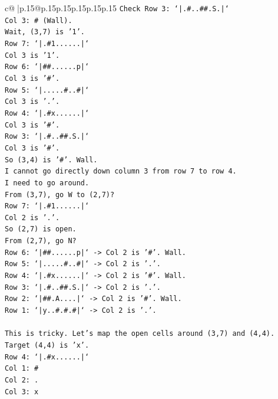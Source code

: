 \documentclass{article}
\begin{document}
{\begin{supertabular}{c@{$\;$}|p{.15\linewidth}@{}p{.15\linewidth}p{.15\linewidth}p{.15\linewidth}p{.15\linewidth}p{.15\linewidth}}
{{{\texttt{Check Row 3: `|.\#..\#\#.S.|`} \\
\texttt{Col 3: \# (Wall).} \\
\texttt{Wait, (3,7) is '1'.} \\
\texttt{Row 7: `|.\#1......|`} \\
\texttt{Col 3 is '1'.} \\
\texttt{Row 6: `|\#\#......p|`} \\
\texttt{Col 3 is '\#'.} \\
\texttt{Row 5: `|.....\#..\#|`} \\
\texttt{Col 3 is '.'.} \\
\texttt{Row 4: `|.\#x......|`} \\
\texttt{Col 3 is '\#'.} \\
\texttt{Row 3: `|.\#..\#\#.S.|`} \\
\texttt{Col 3 is '\#'.} \\
\texttt{So (3,4) is '\#'. Wall.} \\
\texttt{I cannot go directly down column 3 from row 7 to row 4.} \\
\texttt{I need to go around.} \\
\texttt{From (3,7), go W to (2,7)?} \\
\texttt{Row 7: `|.\#1......|`} \\
\texttt{Col 2 is '.'.} \\
\texttt{So (2,7) is open.} \\
\texttt{From (2,7), go N?} \\
\texttt{Row 6: `|\#\#......p|` {-}> Col 2 is '\#'. Wall.} \\
\texttt{Row 5: `|.....\#..\#|` {-}> Col 2 is '.'.} \\
\texttt{Row 4: `|.\#x......|` {-}> Col 2 is '\#'. Wall.} \\
\texttt{Row 3: `|.\#..\#\#.S.|` {-}> Col 2 is '.'.} \\
\texttt{Row 2: `|\#\#.A....|` {-}> Col 2 is '\#'. Wall.} \\
\texttt{Row 1: `|y..\#.\#.\#|` {-}> Col 2 is '.'.} \\
\\ 
\texttt{This is tricky. Let's map the open cells around (3,7) and (4,4).} \\
\texttt{Target (4,4) is 'x'.} \\
\texttt{Row 4: `|.\#x......|`} \\
\texttt{Col 1: \#} \\
\texttt{Col 2: .} \\
\texttt{Col 3: x} \\
}}}
\end{supertabular}}
\end{document}
